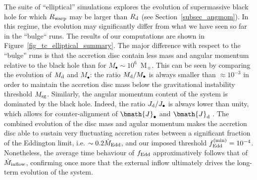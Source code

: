 \documentclass[a4paper,fleqn,usenatbib]{mnras}
\begin{document}
The suite of ``elliptical'' simulations explores the evolution of supermassive black hole for which $R_{\rm warp}$ may be larger than $R_{\rm d}$ (see Section~\ref{subsec_angmom}).
In this regime, the evolution may significantly differ from what we have seen so far in the ``bulge`` runs.
The results of our computations are shown in Figure~\ref{fig_tc_elliptical_summary}.
The major difference with respect to the ``bulge'' runs is that the accretion disc contain less mass and angular momentum relative to the black hole than for $M_{\bullet} \sim 10^6$~M$_{\sun}$.
This can be seen by comparing the evolution of $M_{\rm d}$ and $M_{\bullet}$: the ratio $M_{\rm d}/M_{\bullet}$ is always smaller
than $\approx 10^{-3}$ in order to maintain the accretion disc mass below the gravitational instability threshold $M_{\rm sg}$. 
Similarly, the angular momentum content of the system is dominated by the black hole.
Indeed, the ratio $J_{\rm d}/J_{\bullet}$ is always lower than unity, which allows for counter-alignment of $\bmath{J}_{\bullet}$ and $\bmath{J}_{\rm d}$ \citep{king+05}. 
The combined evolution of the disc mass and agular momentum makes the accretion disc able to sustain very fluctuating accretion rates between a significant fraction of the Eddington limit, i.e. $\sim 0.2 \dot{M}_{\rm Edd}$, and our imposed threshold $f_{\rm Edd}^{\rm (min)} = 10^{-4}$.
Nonetheless, the average time behaviour of $f_{\rm Edd}$ approximatively follows that of $\dot{M}_{\rm inflow}$, confirming once more that the external inflow ultimately drives the long-term evolution of the system.
\end{document}
